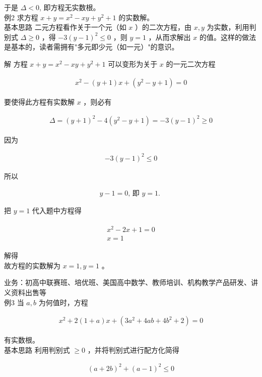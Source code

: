 \documentclass[10pt]{article}
\begin{document}
于是 $\Delta<0$, 即方程无实数根。\\
例2 求方程 $x+y=x^{2}-x y+y^{2}+1$ 的实数解。\\
基本思路 二元方程看作关于一个元（如 $x$ ）的二次方程，由 $x, y$ 为实数，利用判别式 $\Delta \geqslant 0$ ，得 $-3(y-1)^{2} \leqslant 0$ ，则 $y=1$ ，从而求解出 $x$ 的值。这样的做法是基本的，读者需拥有"多元即少元（如一元）"的意识。

解 方程 $x+y=x^{2}-x y+y^{2}+1$ 可以变形为关于 $x$ 的一元二次方程

\begin{align*}
x^{2}-(y+1) x+\left(y^{2}-y+1\right)=0
\end{align*}

要使得此方程有实数解 $x$ ，则必有

\begin{align*}
\Delta=(y+1)^{2}-4\left(y^{2}-y+1\right)=-3(y-1)^{2} \geqslant 0
\end{align*}

因为

\begin{align*}
-3(y-1)^{2} \leqslant 0
\end{align*}

所以

\begin{align*}
y-1=0 \text {, 即 } y=1 \text {. }
\end{align*}

把 $y=1$ 代入题中方程得

\begin{align*}
\begin{gathered}
x^{2}-2 x+1=0 \\
x=1
\end{gathered}
\end{align*}

解得\\
故方程的实数解为 $x=1, y=1$ 。

业务：初高中联赛班、培优班、美国高中数学、教师培训、机构教学产品研发、讲义资料出售等\\
例3 当 $a, b$ 为何值时，方程

\begin{align*}
x^{2}+2(1+a) x+\left(3 a^{2}+4 a b+4 b^{2}+2\right)=0
\end{align*}

有实数根。\\
基本思路 利用判别式 $\geqslant 0$ ，并将判别式进行配方化简得

\begin{align*}
(a+2 b)^{2}+(a-1)^{2} \leqslant 0
\end{align*}
\end{document}
